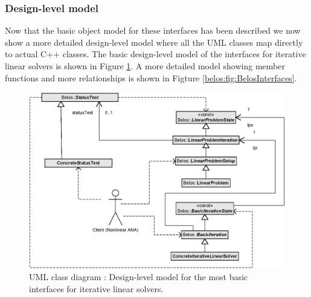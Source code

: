 \documentclass[pdf,ps2pdf,11pt]{SANDreport}
\begin{document}
\subsubsection{Design-level model}

Now that the basic object model for these interfaces has been
described we now show a more detailed design-level model where all the
UML classes map directly to actual C++ classes.  The basic
design-level model of the interfaces for iterative linear solvers is
shown in Figure {}\ref{belos:fig:BelosInterfacesHarder}.  A more
detailed model showing member functions and more relationships is
shown in Figture {}\ref{belos:fig:BelosInterfaces}.



{\bsinglespace
\begin{figure}[t]
\begin{center}
\includegraphics*[scale=0.85]{BelosInterfacesHarder}
\end{center}
\caption{
\label{belos:fig:BelosInterfacesHarder}
UML class diagram : Design-level model
for the most basic interfaces for iterative linear solvers.}
\end{figure}
\esinglespace}
\end{document}
